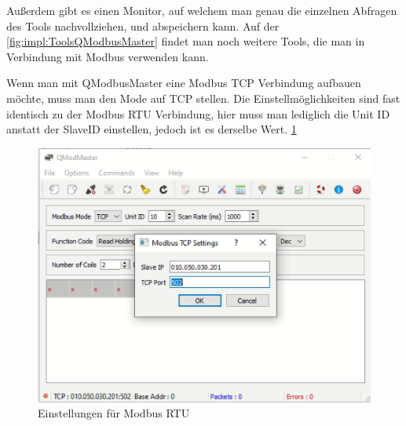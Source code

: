 Außerdem gibt es einen Monitor, auf welchem man genau die einzelnen Abfragen des Tools nachvollziehen, und abspeichern kann. Auf der \ref{fig:impl:ToolsQModbusMaster} findet man noch weitere Tools, die man in Verbindung mit Modbus verwenden kann.  


Wenn man mit QModbusMaster eine Modbus TCP Verbindung aufbauen möchte, muss man den Mode auf TCP stellen. Die Einstellmöglichkeiten sind fast identisch zu der Modbus RTU Verbindung, hier muss man lediglich die Unit ID anstatt der SlaveID einstellen, jedoch ist es derselbe Wert. \ref{fig:impl:QmodbusMasterTCP}

\begin{figure}[h p] 
    \centering
    \includegraphics[scale=0.35]{pics/QmodbusMasterTCP setting.png}
    \caption{Einstellungen für Modbus RTU}
    \label{fig:impl:QmodbusMasterTCP}
\end{figure}
